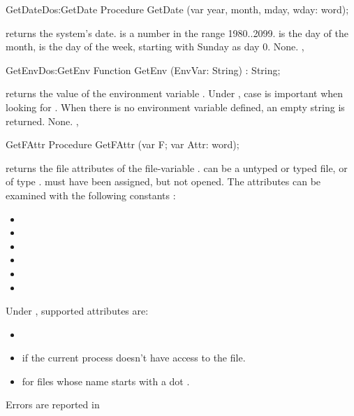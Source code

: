 \begin{procedurel}{GetDate}{Dos:GetDate}
\Declaration
Procedure GetDate (var year, month, mday, wday: word);\Description

 returns the system's date.  is a number in the range
1980..2099. is the day of the month,
 is the day of the week, starting with Sunday as day 0.
\Errors
None.
\SeeAlso
{},
\end{procedurel}


\begin{functionl}{GetEnv}{Dos:GetEnv}
\Declaration
Function GetEnv (EnvVar: String) : String;
\Description

 returns the value of the environment variable .
Under \linux, case is important when looking for .
When there is no environment variable  defined, an empty
string is returned.
\Errors
None.
\SeeAlso
{}, 
\end{functionl}


\begin{procedure}{GetFAttr}
\Declaration
Procedure GetFAttr (var F; var Attr: word);
\Description

 returns the file attributes of the file-variable .
  can be a untyped or typed file, or of type .  must
have been assigned, but not opened. The attributes can be examined with the
following constants :
\begin{itemize}
\item {}
\item {}
\item {}
\item {}
\item {}
\item {}
\end{itemize}
Under \linux, supported attributes are:
\begin{itemize}
\item {}
\item {} if the current process doesn't have access to the file.
\item {} for files whose name starts with a dot .
\end{itemize}

\Errors
Errors are reported in 
\SeeAlso
{}
\end{procedure}

